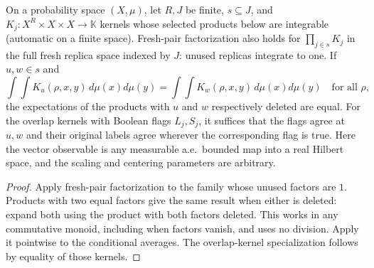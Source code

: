 \begin{lemma}
\label{lem:sg-tal:fresh-deletion-equality}
\leanok
{}
On a probability space $(X,\mu)$, let $R,J$ be finite, $s\subseteq J$, and
$K_j:X^R\times X\times X\to\mathbb K$ kernels whose selected products below are integrable (automatic on
a finite space). Fresh-pair factorization also holds for
$\prod_{j\in s}K_j$ in the full fresh replica space indexed by $J$: unused replicas
integrate to one. If $u,w\in s$ and
\[
 \int\!\int K_u(\rho,x,y)\,d\mu(x)d\mu(y)
 =\int\!\int K_w(\rho,x,y)\,d\mu(x)d\mu(y)\quad\text{for all }\rho,
\]
the expectations of the products with $u$ and $w$ respectively deleted are equal.
For the overlap kernels with Boolean flags $L_j,S_j$, it suffices that the flags agree
at $u,w$ and their original labels agree wherever the corresponding flag is true.
Here the vector observable is any measurable a.e.\ bounded map into a real Hilbert space, and the
scaling and centering parameters are arbitrary.
\end{lemma}
\begin{proof}
\leanok
Apply fresh-pair factorization to the family whose unused factors are $1$. Products
with two equal factors give the same result when either is deleted: expand both using
the product with both factors deleted. This works in any commutative monoid, including
when factors vanish, and uses no division. Apply it pointwise to the conditional averages.
The overlap-kernel specialization follows by equality of those kernels.
\end{proof}

